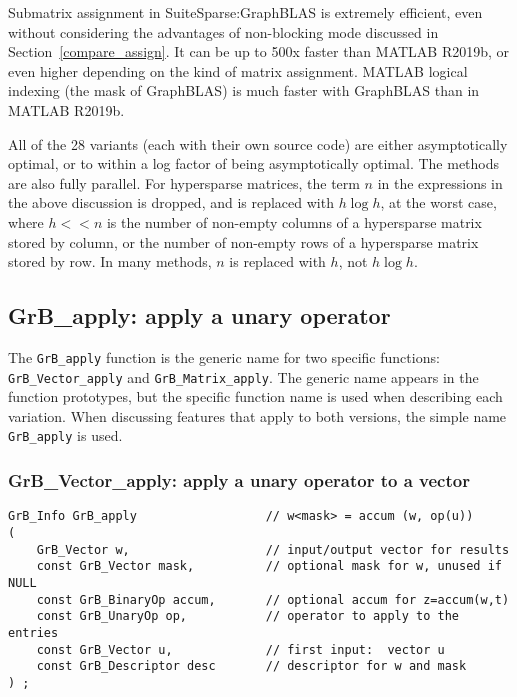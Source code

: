 \documentclass[12pt]{article}
\begin{document}

Submatrix assignment in SuiteSparse:GraphBLAS is extremely efficient, even
without considering the advantages of non-blocking mode discussed in
Section~\ref{compare_assign}.  It can be up to 500x faster than MATLAB
R2019b, or even higher depending on the kind of matrix assignment.
MATLAB logical indexing (the mask of GraphBLAS) is much faster with
GraphBLAS than in MATLAB R2019b.

All of the 28 variants (each with their own source code) are either
asymptotically optimal, or to within a log factor of being asymptotically
optimal.  The methods are also fully parallel.  For hypersparse matrices, the
term $n$ in the expressions in the above discussion is dropped, and is replaced
with $h \log h$, at the worst case, where $h << n$ is the number of non-empty
columns of a hypersparse matrix stored by column, or the number of non-empty
rows of a hypersparse matrix stored by row.  In many methods, $n$ is replaced
with $h$, not $h \log h$.

\newpage
\subsection{{\sf GrB\_apply:} apply a unary operator} %
\label{apply}

The \verb'GrB_apply' function is the generic name for two specific functions:
\\ \verb'GrB_Vector_apply' and  \verb'GrB_Matrix_apply'.  The generic name
appears in the function prototypes, but the specific function name is used when
describing each variation.  When discussing features that apply to both
versions, the simple name \verb'GrB_apply' is used.

\subsubsection{{\sf GrB\_Vector\_apply:} apply a unary operator to a vector}
\label{apply_vector}

\begin{mdframed}[userdefinedwidth=6in]
{\footnotesize
\begin{verbatim}
GrB_Info GrB_apply                  // w<mask> = accum (w, op(u))
(
    GrB_Vector w,                   // input/output vector for results
    const GrB_Vector mask,          // optional mask for w, unused if NULL
    const GrB_BinaryOp accum,       // optional accum for z=accum(w,t)
    const GrB_UnaryOp op,           // operator to apply to the entries
    const GrB_Vector u,             // first input:  vector u
    const GrB_Descriptor desc       // descriptor for w and mask
) ;
\end{verbatim} } \end{mdframed}
\end{document}
